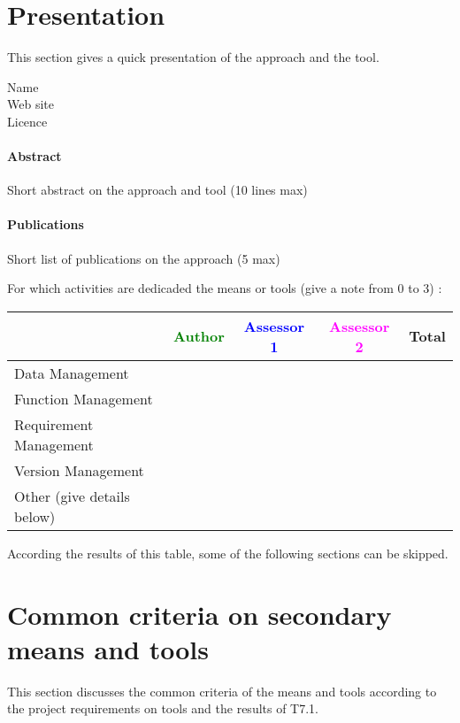 \section{Presentation}

This section gives a quick presentation of the approach and the tool.

\begin{description}
\item[Name] 
\item[Web site] 
\item[Licence] 
\end{description}

\paragraph{Abstract} Short abstract on the approach and tool (10 lines max)

\paragraph{Publications} Short list of publications on the approach (5 max)


For which activities are dedicaded the means or tools (give a note from 0 to  3) :

\begin{tabular}{|l | c | c | c | c|}
\hline
& \textcolor{green}{Author} & \textcolor{blue}{Assessor 1} & \textcolor{magenta}{Assessor 2} & Total \\
\hline 
Data Management & & & &  \\
\hline
Function Management & & & & \\
\hline
Requirement Management & & & & \\
\hline
Version Management & & & & \\
\hline
Other (give details below) & & & & \\
\hline
\end{tabular}

According the results of this table, some of the following sections can be skipped.

\section{Common criteria on secondary means and tools}
\label{common}
This section discusses the common criteria of the means and tools according to the project requirements on tools and the results of T7.1.

